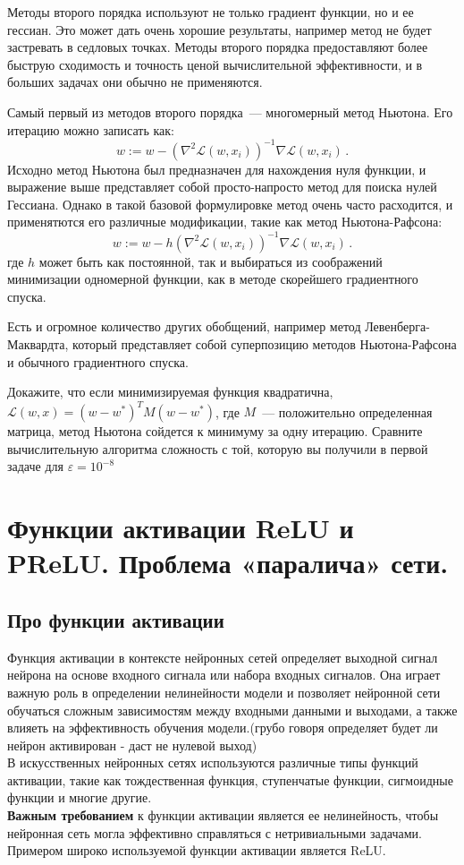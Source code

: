 Методы второго порядка используют не только градиент функции, но и ее гессиан. Это может дать очень хорошие результаты, например метод не будет застревать в седловых точках. Методы второго порядка предоставляют более быструю сходимость и точность ценой вычислительной эффективности, и в больших задачах они обычно не применяются.

Самый первый из методов второго порядка~--- многомерный метод Ньютона. Его итерацию можно записать как:
\[
w := w - \left(\nabla^2\mathcal{L}(w, x_i)\right)^{-1}\nabla \mathcal{L}(w, x_i)\,.
\]
Исходно метод Ньютона был предназначен для нахождения нуля функции, и выражение выше представляет собой просто-напросто метод для поиска нулей Гессиана. Однако в такой базовой формулировке метод очень часто расходится, и применятются его различные модификации, такие как метод Ньютона-Рафсона:
\[
w := w - h\left(\nabla^2\mathcal{L}(w, x_i)\right)^{-1}\nabla \mathcal{L}(w, x_i)\,.
\]
где $h$ может быть как постоянной, так и выбираться из соображений минимизации одномерной функции, как в методе скорейшего градиентного спуска.

Есть и огромное количество других обобщений, например метод Левенберга-Маквардта, который представляет собой суперпозицию методов Ньютона-Рафсона и обычного градиентного спуска.

\begin{problem}
    Докажите, что если минимизируемая функция квадратична, $\mathcal{L}(w, x) = (w - w^*)^T M (w - w^*)$, где $M$~--- положительно определенная матрица, метод Ньютона сойдется к минимуму за одну итерацию. Сравните вычислительную алгоритма сложность с той, которую вы получили в первой задаче для $\varepsilon = 10^{-8}$
\end{problem}

\section{Функции активации ReLU и PReLU. Проблема «паралича» сети.}
\subsection{Про функции активации}

Функция активации в контексте нейронных сетей определяет выходной сигнал нейрона на основе входного сигнала или набора входных сигналов. Она играет важную роль в определении нелинейности модели и позволяет нейронной сети обучаться сложным зависимостям между входными данными и выходами, а также влияеть на эффективность обучения модели.(грубо говоря определяет будет ли нейрон активирован - даст не нулевой выход) \\
В искусственных нейронных сетях используются различные типы функций активации, такие как тождественная функция, ступенчатые функции, сигмоидные функции и многие другие. \\
\textbf{Важным требованием} к функции активации является ее нелинейность, чтобы нейронная сеть могла эффективно справляться с нетривиальными задачами.\\ Примером широко используемой функции активации является ReLU.

